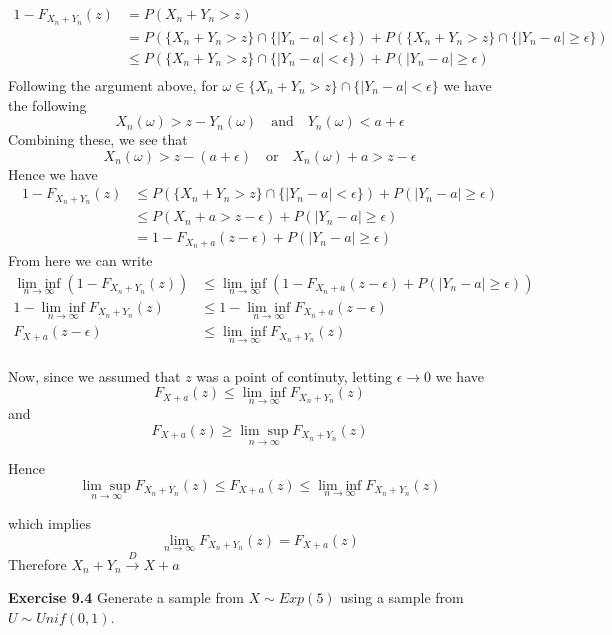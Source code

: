 \documentclass[12pt]{article}  %
\newcommand{\e}{{\epsilon}}
\begin{document}
\begin{align*}
1 - F_{X_n + Y_n}(z) &= P(X_n + Y_n>z)\\
&= P(\{X_n + Y_n> z\}\cap \{|Y_n -a|<\e\}) + P(\{X_n + Y_n>z\}\cap \{|Y_n -a|\geq\e\}) \\
&\leq P(\{X_n + Y_n>z\}\cap \{|Y_n -a|<\e\}) + P(|Y_n -a|\geq\e)\\
\end{align*}
Following the argument above, for $\omega \in \{X_n + Y_n> z\}\cap \{|Y_n -a|<\e\}$ we have the following 
$$X_n(\omega) > z - Y_n(\omega)\hspace{1em}\text{and}\hspace{1em}Y_n(\omega) < a+\e $$
Combining these, we see that $$X_n(\omega)> z - (a+\e) \hspace{1em}\text{or}\hspace{1em}X_n(\omega) + a> z - \e$$Hence we have 
\begin{align*}
1 - F_{X_n + Y_n}(z)&\leq P(\{X_n + Y_n> z\}\cap \{|Y_n -a|<\e\}) + P(|Y_n -a|\geq\e)\\
&\leq P(X_n + a>z - \e) + P(|Y_n -a|\geq\e)\\
&= 1 - F_{X_n + a}(z-\e) + P(|Y_n -a|\geq\e)
\end{align*} 
From here we can write 
\begin{align*}
\underset{n\to\infty}{\lim\inf}(1 - F_{X_n + Y_n}(z))&\leq \underset{n\to\infty}{\lim\inf}\left(1 - F_{X_n + a}(z-\e) + P(|Y_n -a|\geq\e)\right)\\
1 - \underset{n\to\infty}{\lim\inf}F_{X_n + Y_n}(z)&\leq 1 - \underset{n\to\infty}{\lim\inf}F_{X_n + a}(z-\e)\\
F_{X + a}(z-\e)&\leq \underset{n\to\infty}{\lim\inf}F_{X_n + Y_n}(z)\\
\end{align*}

Now, since we assumed that $z$ was a point of continuty, letting $\e\to 0$ we have $$F_{X + a}(z)\leq \underset{n\to\infty}{\lim\inf}F_{X_n + Y_n}(z)$$ and $$F_{X + a}(z)\geq \underset{n\to\infty}{\lim\sup}F_{X_n + Y_n}(z)$$

Hence $$\underset{n\to\infty}{\lim\sup}F_{X_n + Y_n}(z)\leq F_{X + a}(z)\leq \underset{n\to\infty}{\lim\inf}F_{X_n + Y_n}(z)$$

which implies $$\lim_{n\to\infty} F_{X_n + Y_n}(z) = F_{X+a}(z)$$
Therefore $X_n +Y_n \overset{D}{\to} X + a$

\newpage 

\textbf{Exercise 9.4} Generate a sample from $X \sim Exp(5)$ using a sample from $U\sim Unif(0,1)$. 
\end{document}
